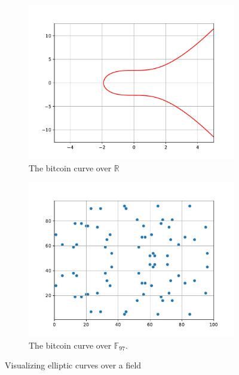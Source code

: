 \documentclass{article}
\begin{document}
    \begin{figure}[htbp]
        \centering
        
        \begin{subfigure}[t]{.45\textwidth}
            \centering
            \includegraphics[scale = 0.4]{images/curve.pdf}
            \caption{The bitcoin curve over $\mathbb{R}$}
            \label{fig:bitcoin_field_real}
        \end{subfigure}
        \begin{subfigure}[t]{.45\textwidth}
            \centering
            \includegraphics[scale = 0.4]{images/curve_over_field.pdf}
            \caption{The bitcoin curve over $\mathbb{F}_{97}$.}
            \label{fig:bitcoin_curve_field}
        \end{subfigure}
        \caption{Visualizing elliptic curves over a field}
        \label{fig:bitcoin_curve}
    \end{figure}
\end{document}
